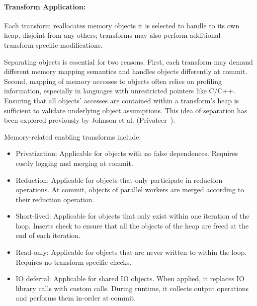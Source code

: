 \paragraph{Transform Application:}
Each transform reallocates
memory objects it is selected to handle
to its own heap, disjoint from any others; transforms may also
perform additional transform-specific modifications.

Separating objects is essential
for two reasons. First, each transform may demand different
memory mapping semantics and handles objects differently at commit.
Second, mapping of memory accesses to
objects often relies on profiling information, especially in languages with
unrestricted pointers like C/C++. Ensuring that all objects' accesses
are contained within a transform's heap is sufficient to
validate underlying object assumptions. This idea of separation has
been explored previously by Johnson et al. (Privateer~\cite{johnson:12:pldi}).

Memory-related enabling transforms include:

\begin{itemize}
%
  \item Privatization: Applicable for objects with no false dependences.
  Requires costly logging and merging at commit.

\item Reduction: Applicable for objects that only participate in
reduction operations. At commit, objects of parallel
workers are merged according to their reduction operation.




\item Short-lived: Applicable for objects that only exist within one
iteration of the loop. Inserts check to ensure that all
the objects of the heap are freed at the end of each iteration.

\item Read-only: Applicable for objects that are never written to within
the loop. Requires no transform-specific checks.

\item IO deferral: Applicable for shared IO objects. When applied, it
replaces IO library calls with custom calls. During runtime, it
collects output operations and performs them in-order at commit.

\end{itemize}

